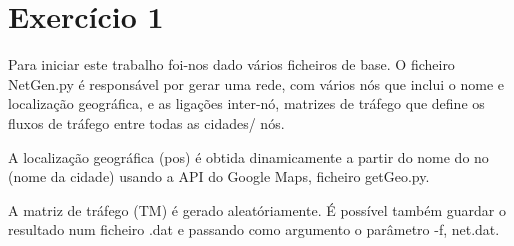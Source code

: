 \documentclass[pdftex,12pt,a4paper]{report}
\begin{document}
\renewcommand{\headrulewidth}{0pt}

\fancyhead{}
\fancyfoot{}
\rfoot{\thepage}

\renewcommand*\contentsname{Conteúdos}
\renewcommand*\figurename{Figura}
\renewcommand*\tablename{Tabela}

\tableofcontents
\renewcommand{\headrulewidth}{0.15pt}
\renewcommand{\thechapter}{}



\clearpage

\section{Exercício 1}

Para iniciar este trabalho foi-nos dado vários ficheiros de base. O ficheiro NetGen.py é responsável por gerar uma rede, com vários nós que inclui o nome e localização geográfica, e as ligações inter-nó, matrizes de tráfego que define os fluxos de tráfego entre todas as cidades/ nós.

A localização geográfica (pos) é obtida dinamicamente a partir do nome do no (nome da cidade) usando a API do Google Maps, ficheiro getGeo.py. 

A matriz de tráfego (TM) é gerado aleatóriamente. É possível também guardar o resultado num ficheiro .dat e passando como argumento o parâmetro -f, net.dat.
\end{document}
